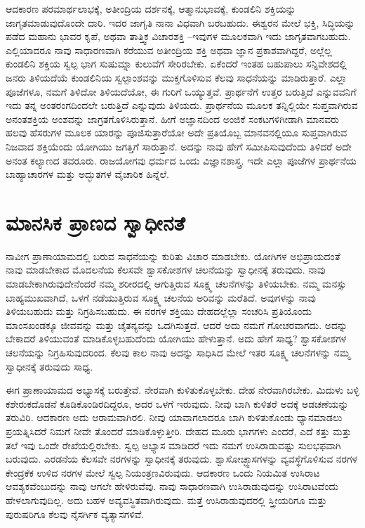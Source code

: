 \vskip 6pt

ಆದಕಾರಣ ಪರಮಾರ್ಥಲಾಭಕ್ಕೆ, ಅತೀಂದ್ರಿಯ ದರ್ಶನಕ್ಕೆ, ಆತ್ಮಾನುಭಾವಕ್ಕೆ, ಕುಂಡಲಿನಿ ಶಕ್ತಿಯನ್ನು ಜಾಗೃತಮಾಡುವುದೊಂದೇ ದಾರಿ. ಇದರ ಜಾಗೃತಿ ನಾನಾ ವಿಧವಾಗಿ ಬರಬಹುದು. ಈಶ್ವರನ ಮೇಲೆ ಭಕ್ತಿ, ಸಿದ್ಧಿಯನ್ನು ಪಡೆದ ಮಹಾನು ಭಾವರ ಕೃಪೆ, ಅಥವಾ ತಾತ್ತ್ವಿಕ ವಿಚಾರಶಕ್ತಿ –ಇವುಗಳ ಮೂಲಕವಾಗಿ ಇದು ಜಾಗೃತವಾಗಬಹುದು. ಎಲ್ಲಿಯಾದರೂ ನಾವು ಸಾಧಾರಣವಾಗಿ ಕರೆಯುವ ಅತೀಂದ್ರಿಯ ಶಕ್ತಿ ಅಥವಾ ಜ್ಞಾನ ಪ್ರಕಾಶವಾಗಿದ್ದರೆ, ಅಲ್ಲೆಲ್ಲ ಕುಂಡಲಿನಿ ಶಕ್ತಿಯ ಸ್ವಲ್ಪ ಭಾಗ ಸುಷುಮ್ನಾ ಕುಲುವೆಗೆ ಸೇರಿರಬೇಕು. ಏಕೆಂದರೆ ಇಂತಹ ಬಹುಪಾಲು ಸನ್ನಿವೇಶದಲ್ಲಿ ಜನರು ತಿಳಿಯದೆಯೆ ಕುಂಡಲಿನಿಯ ಸ್ವಲ್ಪಾಂಶವನ್ನು ಮುಕ್ತಗೊಳಿಸುವ ಕೆಲವು ಸಾಧನೆಯನ್ನು ಮಾಡಿರುತ್ತಾರೆ. ಎಲ್ಲಾ ಪೂಜೆಗಳೂ, ನಮಗೆ ತಿಳಿದೋ ತಿಳಿಯದೆಯೋ, ಈ ಗುರಿಗೆ ಒಯ್ಯುತ್ತವೆ. ಪ್ರಾರ್ಥನೆಗೆ ಉತ್ತರ ಬರುತ್ತಿದೆ ಎನ್ನುವವನಿಗೆ ಇದು ತನ್ನ ಅಂತರಂಗದಿಂದಲೇ ಬರುತ್ತಿದೆ ಎನ್ನುವುದು ತಿಳಿಯದು. ಪ್ರಾರ್ಥನೆಯ ಮೂಲಕ ತನ್ನಿಲ್ಲಿಯೇ ಸುಪ್ತವಾಗಿರುವ ಅನಂತಶಕ್ತಿಯ ಅಂಶವನ್ನು ಜಾಗ್ರತಗೊಳಿಸಿರುತ್ತಾನೆ. ಹೀಗೆ ಅಜ್ಞಾನದಿಂದ ಅಂಜಿಕೆ ಸಂಕಟಗಳಿಗೀಡಾಗಿ ಮಾನವರು ಹಲವು ಹೆಸರುಗಳ ಮೂಲಕ ಯಾರನ್ನು ಪೂಜಿಸುತ್ತಾರೆಯೋ ಅದೇ ಪ್ರತಿಯೊಬ್ಬ ಮಾನವನಲ್ಲಿಯೂ ಸುಪ್ತವಾಗಿರುವ ನಿಜವಾದ ಶಕ್ತಿಯೆಂದು ಯೋಗಿಯು ಜಗತ್ತಿಗೆ ಸಾರುತ್ತಾನೆ. ಅದನ್ನು ನಾವು ಹೇಗೆ ಸಮೀಪಿಸುವುದೆಂದು ತಿಳಿದರೆ ಅದೇ ಅನಂತ ಕಲ್ಯಾಣದ ತವರೂರು. ರಾಜಯೋಗವು ಧರ್ಮದ ಒಂದು ವಿಜ್ಞಾನಶಾಸ್ತ್ರ. ಇದೇ ಎಲ್ಲಾ ಪೂಜೆಗಳ ಪ್ರಾರ್ಥನೆಯ ಬಾಹ್ಯಾಚಾರಗಳ ಮತ್ತು ಅದ್ಭುತಗಳ ವೈಚಾರಿಕ ಹಿನ್ನೆಲೆ.

\chapter{ಮಾನಸಿಕ ಪ್ರಾಣದ ಸ್ವಾಧೀನತೆ}

ನಾವೀಗ ಪ್ರಾಣಾಯಾಮದಲ್ಲಿ ಬರುವ ಸಾಧನೆಯನ್ನು ಕುರಿತು ವಿಚಾರ ಮಾಡಬೇಕು. ಯೋಗಿಗಳ ಅಭಿಪ್ರಾಯದಂತೆ ನಾವು ಮಾಡಬೇಕಾದ ಮೊದಲನೆಯ ಕೆಲಸವೇ ಶ್ವಾಸಕೋಶಗಳ ಚಲನೆಯನ್ನು ಸ್ವಾಧೀನಕ್ಕೆ ತರುವುದು. ನಾವು ಮಾಡಬೇಕಾಗಿರುವುದೇನೆಂದರೆ ನಮ್ಮ ಶರೀರದಲ್ಲಿ ಆಗುತ್ತಿರುವ ಸೂಕ್ಷ್ಮ ಚಲನೆಗಳನ್ನು ತಿಳಿಯಬೇಕು. ನಮ್ಮ ಮನಸ್ಸು ಬಾಹ್ಯಮುಖವಾಗಿದೆ, ಒಳಗೆ ನಡೆಯುತ್ತಿರುವ ಸೂಕ್ಷ್ಮ ಚಲನೆಯ ಅರಿವನ್ನು ಮರೆತಿದೆ. ಅವುಗಳನ್ನು ನಾವು ತಿಳಿಯಬಹುದು ಮತ್ತು ನಿಗ್ರಹಿಸಬಹುದು. ಈ ನರಗಳ ಶಕ್ತಿಯು ದೇಹದಲ್ಲೆಲ್ಲಾ ಸಂಚರಿಸಿ ಪ್ರತಿಯೊಂದು ಮಾಂಸಖಂಡಕ್ಕೂ ಜೀವವನ್ನು ಮತ್ತು ಚೈತನ್ಯವನ್ನು ಒದಗಿಸುತ್ತದೆ. ಆದರೆ ಅದು ನಮಗೆ ಗೋಚರವಾಗದು. ಅದನ್ನು ಬೇಕಾದರೆ ತಿಳಿಯುವಂತೆ ಮಾಡಿಕೊಳ್ಳಬಹುದೆಂದು ಯೋಗಿಯು ಹೇಳುತ್ತಾನೆ. ಅದು ಹೇಗೆ ಸಾಧ್ಯ? ಶ್ವಾಸಕೋಶಗಳ ಚಲನೆಯನ್ನು ನಿಗ್ರಹಿಸುವುದರಿಂದ. ಕೆಲವು ಕಾಲ ನಾವು ಅದನ್ನು ಸಾಧಿಸಿದ ಮೇಲೆ ಇತರ ಸೂಕ್ಷ್ಮ ಚಲನೆಗಳನ್ನು ನಮ್ಮ ಸ್ವಾಧೀನಕ್ಕೆ ತರುವುದು ಸಾಧ್ಯ. 

ಈಗ ಪ್ರಾಣಾಯಾಮದ ಅಭ್ಯಾಸಕ್ಕೆ ಬರುತ್ತೇವೆ. ನೇರವಾಗಿ ಕುಳಿತುಕೊಳ್ಳಬೇಕು. ದೇಹ ನೇರವಾಗಿರಬೇಕು. ಮಿದುಳು ಬಳ್ಳಿ ಕಶೇರುಕದೊಡನೆ ಕೂಡಿಕೊಂಡಿರದಿದ್ದರೂ, ಅದರ ಒಳಗೆ ಇರುವುದು. ನೀವು ಬಾಗಿ ಕುಳಿತರೆ ಅದಕ್ಕೆ ಅಡಚಣೆಯನ್ನು ತರುವಿರಿ. ಆದಕಾರಣ ಅದು ಆರಾಮವಾಗಿರಲಿ. ನೀವು ಯಾವಾಗಲಾದರೂ ಬಾಗಿ ಕುಳಿತುಕೊಂಡು ಧ್ಯಾನಮಾಡಲು ಪ್ರಯತ್ನಿಸಿದರೆ ನಿಮಗೆ ನೀವೇ ತೊಂದರೆ ಮಾಡಿಕೊಳ್ಳುತ್ತೀರಿ. ದೇಹದ ಮೂರು ಭಾಗಗಳು ಎಂದರೆ, ಎದೆ ಕತ್ತು ಮತ್ತು ತಲೆ ಇವು ಒಂದೇ ರೇಖೆಯಲ್ಲಿರಬೇಕು. ಸ್ವಲ್ಪ ಅಭ್ಯಾಸ ಮಾಡಿದರೆ ಇದು ನಮಗೆ ಉಸಿರಾಡುವಷ್ಟು ಸುಲಭಫವಾಗಿ ಬರುವುದು. ಎರಡನೆಯ ಕೆಲಸವೇ ನರಗಳನ್ನು ಸ್ವಾಧೀನಕ್ಕೆ ತರುವುದು. ಶ್ವಾಸೋಚ್ಛ್ವಾಸಗಳನ್ನು ವ್ಯವಸ್ಥೆಗೊಳಿಸುವ ನರಗಳ ಕೇಂದ್ರಕೆಕ ಉಳಿದ ನರಗಳ ಮೇಲೆ ಸ್ವಲ್ಪ ನಿಯಂತ್ರಣವಿರುವುದು. ಆದಕಾರಣ ಒಂದು ನಿಯಮಿತ ಉಸಿರಾಟ ಆವಶ್ಯಕವೆಂಬುದನ್ನು ನಾವು ಆಗಲೇ ಹೇಳಿರುವೆವು. ನಾವು ಸಾಧಾರಣವಾಗಿ ಉಸಿರಾಡುವುದನ್ನು ಉಸಿರಾಟವೆಂದು ಹೇಳಲಾಗುವುದಿಲ್ಲ. ಅದು ಬಹಳ ಅವ್ಯವಸ್ಥಿತವಾಗಿರುವುದು. ಮತ್ತೆ ಉಸಿರಾಡುವುದರಲ್ಲಿ ಸ್ತ್ರೀಯರಿಗೂ ಮತ್ತು ಪುರುಷರಿಗೂ ಕೆಲವು ನೈಸರ್ಗಿಕ ವ್ಯತ್ಯಾಸಗಳಿವೆ. 

